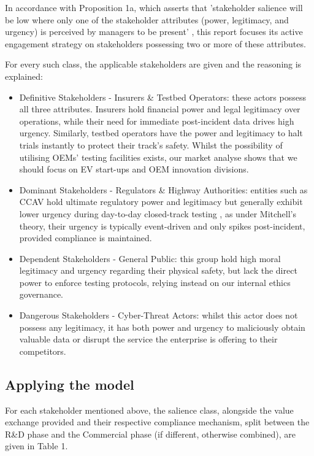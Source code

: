 In accordance with Proposition 1a, which asserts that 'stakeholder salience will be low where only one of the stakeholder attributes (power, legitimacy, and urgency) is perceived by managers to be present' \cite[p.~874]{mitchell_1997}, this report focuses its active engagement strategy on stakeholders possessing two or more of these attributes.

For every such class, the applicable stakeholders are given and the reasoning is explained:

\begin{itemize}
  \item Definitive Stakeholders - Insurers \& Testbed Operators: these actors possess all three attributes. Insurers hold financial power and legal legitimacy over operations, while their need for immediate post-incident data drives high urgency. Similarly, testbed operators have the power and legitimacy to halt trials instantly to protect their track's safety. Whilst the possibility of utilising OEMs' testing facilities exists, our market analyse shows that we should focus on EV start-ups and OEM innovation divisions.
  \item Dominant Stakeholders - Regulators \& Highway Authorities: entities such as CCAV hold ultimate regulatory power and legitimacy but generally exhibit lower urgency during day-to-day closed-track testing %
, as under Mitchell's theory, their urgency is typically event-driven and only spikes post-incident, provided compliance is maintained.
  \item Dependent Stakeholders - General Public: this group hold high moral legitimacy and urgency regarding their physical safety, but lack the direct power to enforce testing protocols, relying instead on our internal ethics governance.
  \item Dangerous Stakeholders - Cyber-Threat Actors: whilst this actor does not possess any legitimacy, it has both power and urgency to maliciously obtain valuable data or disrupt the service the enterprise is offering to their competitors.
\end{itemize}

\subsection{Applying the model}

For each stakeholder mentioned above, the salience class, alongside the value exchange provided and their respective compliance mechanism, split between the R\&D phase and the Commercial phase (if different, otherwise combined), are given in Table 1.


